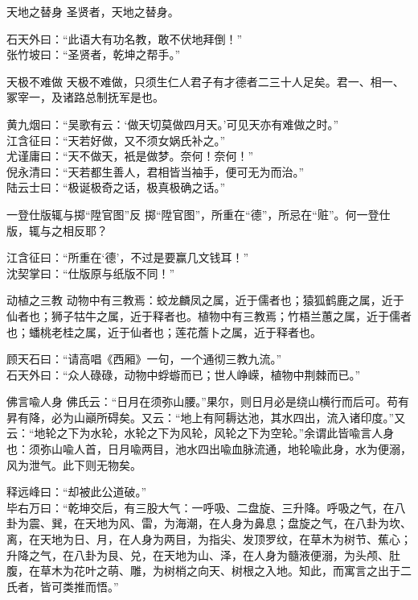 \begin{yulu}{天地之替身}
圣贤者，天地之替身。
\begin{comments}
石天外曰：“此语大有功名教，敢不伏地拜倒！” \\
张竹坡曰：“圣贤者，乾坤之帮手。”
\end{comments}
\end{yulu}

\begin{yulu}{天极不难做}
天极不难做，只须生仁人君子有才德者二三十人足矣。君一、相一、冢宰一，及诸路总制抚军是也。
\begin{comments}
黄九烟曰：“吴歌有云：‘做天切莫做四月天。’可见天亦有难做之时。” \\
江含征曰：“天若好做，又不须女娲氏补之。” \\
尤谨庸曰：“天不做天，衹是做梦。奈何！奈何！” \\
倪永清曰：“天若都生善人，君相皆当袖手，便可无为而治。” \\
陆云士曰：“极诞极奇之话，极真极确之话。”
\end{comments}
\end{yulu}

\begin{yulu}{一登仕版辄与掷“陞官图”反}
掷“陞官图”，所重在“德”，所忌在“赃”。何一登仕版，辄与之相反耶？
\begin{comments}
江含征曰：“所重在‘德’，不过是要赢几文钱耳！” \\
沈契掌曰：“仕版原与纸版不同！”
\end{comments}
\end{yulu}

\begin{yulu}{动植之三教}
动物中有三教焉：蛟龙麟凤之属，近于儒者也；猿狐鹤鹿之属，近于仙者也；狮子牯牛之属，近于释者也。植物中有三教焉；竹梧兰蕙之属，近于儒者也；蟠桃老桂之属，近于仙者也；莲花薝卜之属，近于释者也。
\begin{comments}
顾天石曰：“请高唱《西厢》一句，一个通彻三教九流。” \\
石天外曰：“众人碌碌，动物中蜉蝣而已；世人峥嵘，植物中荆棘而已。”
\end{comments}
\end{yulu}

\begin{yulu}{佛言喩人身}
佛氏云：“日月在须弥山腰。”果尔，则日月必是绕山横行而后可。苟有昇有降，必为山巓所碍矣。又云：“地上有阿耨达池，其水四出，流入诸印度。”又云：“地轮之下为水轮，水轮之下为风轮，风轮之下为空轮。”余谓此皆喩言人身也：须弥山喩人首，日月喩两目，池水四出喩血脉流通，地轮喩此身，水为便溺，风为泄气。此下则无物矣。
\begin{comments}
释远峰曰：“却被此公道破。” \\
毕右万曰：“乾坤交后，有三股大气：一呼吸、二盘旋、三升降。呼吸之气，在八卦为震、巽，在天地为风、雷，为海潮，在人身为鼻息；盘旋之气，在八卦为坎、离，在天地为日、月，在人身为两目，为指尖、发顶罗纹，在草木为树节、蕉心；升降之气，在八卦为艮、兑，在天地为山、泽，在人身为髓液便溺，为头颅、肚腹，在草木为花叶之萌、雕，为树梢之向天、树根之入地。知此，而寓言之出于二氏者，皆可类推而悟。”
\end{comments}
\end{yulu}

